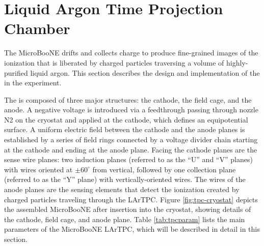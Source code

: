 \section{Liquid Argon Time Projection Chamber}
\label{sec:tpc-all}

The MicroBooNE \lartpc drifts and collects charge to produce fine-grained images of the ionization that is liberated by charged particles traversing a volume of highly-purified liquid argon.  This section describes the design and implementation of the \lartpc in the experiment.

The \lartpc is composed of three major structures: the cathode, the field cage, and the anode. A negative voltage is introduced via a feedthrough passing through nozzle N2 on the cryostat and applied at the cathode, which defines an equipotential surface.   A uniform electric field between the cathode and the anode planes is established by a series of field rings connected by a voltage divider chain starting at the cathode and ending at the anode plane.   Facing the cathode planes are the sense wire planes: two induction planes (referred to as the ``U'' and ``V'' planes) with wires oriented at $\pm60^{\circ}$ from vertical, followed by one collection plane (referred to as the ``Y'' plane) with vertically-oriented wires.   The wires of the anode planes are the sensing elements that detect the ionization created by charged particles traveling through the LArTPC.  Figure \ref{fig:tpc-cryostat} depicts the assembled MicroBooNE \lartpc after insertion into the cryostat, showing details of the cathode, field cage, and anode plane.  Table \ref{tab:tpcparam} lists the main parameters of the MicroBooNE LArTPC, which will be described in detail in this section.  



